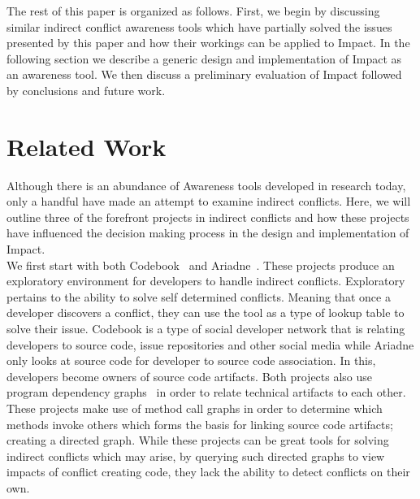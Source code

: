 \documentclass[conference]{IEEEtran}
\begin{document}
The rest of this paper is organized as follows. First, we begin by discussing
similar indirect conflict awareness tools which have partially solved the
issues presented by this paper and how their workings can be applied to 
Impact. In the following section we describe a generic design and implementation
of Impact as an awareness tool. We then discuss a preliminary evaluation of
Impact followed by conclusions and future work.\\


\section{Related Work}
Although there is an abundance of Awareness tools developed in research
today, only a handful have made an attempt to examine indirect conflicts.
Here, we will outline three of the forefront projects in indirect conflicts
and how these projects have influenced the decision making process in
the design and implementation of Impact.\\

We first start with both Codebook~\cite{Begel:2010:CDE} and 
Ariadne~\cite{Trainer:2005:BGT}. These projects produce an exploratory
environment for developers to handle indirect conflicts. Exploratory
pertains to the ability to solve self determined conflicts. Meaning that
once a developer discovers a conflict, they can use the tool as a type of
lookup table to solve their issue. Codebook is a type of social developer
network that is relating developers to source code, issue repositories and
other social media while Ariadne only looks at source code for developer
to source code association. In this, developers become
owners of source code artifacts. Both projects also use program 
dependency graphs~\cite{Horwitz:1992:UPD}
in order to relate technical artifacts to each other. These projects make 
use of method call graphs in order to 
determine which methods invoke others which forms the basis for 
linking source code artifacts; creating a directed graph. While these 
projects can be great tools 
for solving indirect conflicts which may arise, by querying such directed
graphs to view impacts of conflict creating code, they lack the ability to
detect conflicts on their own.\\
\end{document}
